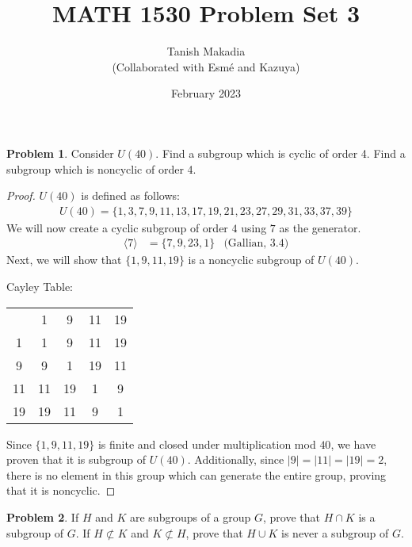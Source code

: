 \documentclass[12pt,reqno]{article}
\title{MATH 1530 Problem Set 3}
\author{Tanish Makadia\\\small{(Collaborated with Esmé and Kazuya)}}
\date{February 2023}
\theoremstyle{plain}
\theoremstyle{definition}
\newtheorem{problem}{Problem}
\begin{document}
\maketitle


\begin{problem} 
    Consider $U(40)$. Find a subgroup which is cyclic of order 4. Find a subgroup which is noncyclic of order 4. 
\end{problem}
\begin{proof}
    \(U(40)\) is defined as follows:
    \begin{align*}
        U(40) = \{1,3,7,9,11,13,17,19,21,23,27,29,31,33,37,39\}
    \end{align*}
    We will now create a cyclic subgroup of order \(4\) using \(7\) as the generator.
    \begin{align*}
        \langle 7\rangle &= \{7,9,23,1\} & \text{(Gallian, 3.4)}
    \end{align*}
    Next, we will show that \(\{1,9,11,19\}\) is a noncyclic subgroup of \(U(40)\).
    
    Cayley Table:
    \begin{tabular}{c | c c c c}
        & 1 & 9 & 11 & 19\\
        \cline{1-5}
        1 & 1 & 9 & 11 & 19 \\
        9 & 9 & 1 & 19 & 11 \\
        11 & 11 & 19 & 1 & 9 \\
        19 & 19 & 11 & 9 & 1
    \end{tabular}

    Since \(\{1,9,11,19\}\) is finite and closed under multiplication mod \(40\), we have proven
    that it is subgroup of \(U(40)\). Additionally, since \(|9|=|11|=|19|=2\), there is no element
    in this group which can generate the entire group, proving that it is noncyclic.
\end{proof}

\newpage


\begin{problem}
    If $H$ and $K$ are subgroups of a group $G$, prove that $H \cap K$ is a subgroup of $G$. If $H \not \subset K$ and $K \not \subset H$, prove that $H \cup K$ is never a subgroup of $G$.
\end{problem}

\newpage
\end{document}
